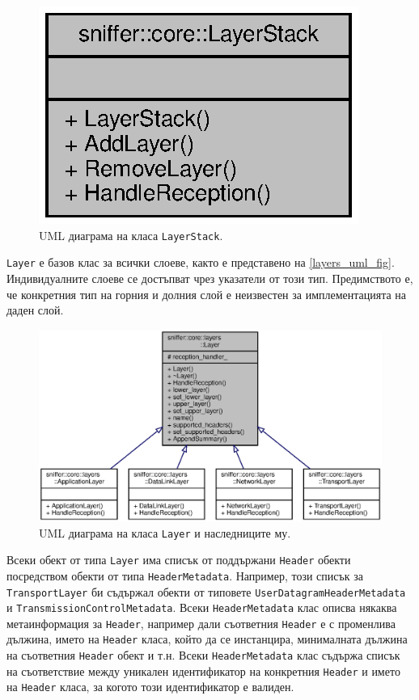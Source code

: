 \documentclass[12pt,a4paper,oneside]{book}
\begin{document}
\begin{figure}[h!]
  \centering
  \includegraphics[scale=.9]{figures/layer_stack_uml.eps}
  \caption{UML диаграма на класа \texttt{LayerStack}.}
  \label{layer_stack_uml_fig}
\end{figure}

\texttt{Layer} е базов клас за всички слоеве, както е представено на
\autoref{layers_uml_fig}.  Индивидуалните слоеве се достъпват чрез указатели
от този тип. Предимството е, че конкретния тип на горния и долния слой е
неизвестен за имплементацията на даден слой.

\begin{figure}[h!]
  \centering
  \includegraphics[scale=.7]{figures/layers_uml.eps}
  \caption{UML диаграма на класа \texttt{Layer} и наследниците му.}
  \label{layers_uml_fig}
\end{figure}

Всеки обект от типа \texttt{Layer} има списък от поддържани \texttt{Header}
обекти посредством обекти от типа \texttt{HeaderMetadata}. Например, този списък за
\texttt{TransportLayer} би съдържал обекти от типовете
\texttt{UserDatagramHeaderMetadata} и \texttt{TransmissionControlMetadata}.
Всеки \texttt{HeaderMetadata} клас описва някаква метаинформация за
\texttt{Header},
например дали съответния \texttt{Header} е с променлива дължина, името на
\texttt{Header} класа, който да се инстанцира, минималната дължина на
съответния \texttt{Header} обект
и т.н. Всеки \texttt{HeaderMetadata} клас съдържа списък на съответствие между
уникален идентификатор на конкретния \texttt{Header} и името на \texttt{Header}
класа, за когото този идентификатор е валиден.
\end{document}
